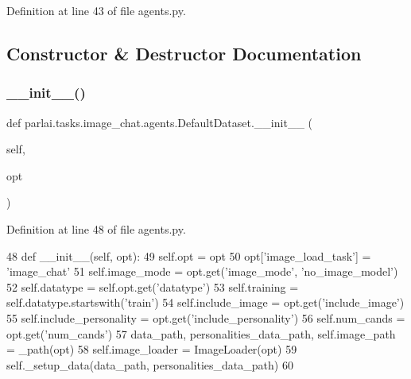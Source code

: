 Definition at line 43 of file agents.\+py.



\subsection{Constructor \& Destructor Documentation}
\mbox{\label{classparlai_1_1tasks_1_1image__chat_1_1agents_1_1DefaultDataset_a4459f064418d6dbeb9e00da5ac54c49c}} 
\subsubsection{\texorpdfstring{\+\_\+\+\_\+init\+\_\+\+\_\+()}{\_\_init\_\_()}}
{\footnotesize\ttfamily def parlai.\+tasks.\+image\+\_\+chat.\+agents.\+Default\+Dataset.\+\_\+\+\_\+init\+\_\+\+\_\+ (\begin{DoxyParamCaption}\item[{}]{self,  }\item[{}]{opt }\end{DoxyParamCaption})}



Definition at line 48 of file agents.\+py.


\begin{DoxyCode}
48     \textcolor{keyword}{def }\_\_init\_\_(self, opt):
49         self.opt = opt
50         opt[\textcolor{stringliteral}{'image\_load\_task'}] = \textcolor{stringliteral}{'image\_chat'}
51         self.image\_mode = opt.get(\textcolor{stringliteral}{'image\_mode'}, \textcolor{stringliteral}{'no\_image\_model'})
52         self.datatype = self.opt.get(\textcolor{stringliteral}{'datatype'})
53         self.training = self.datatype.startswith(\textcolor{stringliteral}{'train'})
54         self.include\_image = opt.get(\textcolor{stringliteral}{'include\_image'})
55         self.include\_personality = opt.get(\textcolor{stringliteral}{'include\_personality'})
56         self.num\_cands = opt.get(\textcolor{stringliteral}{'num\_cands'})
57         data\_path, personalities\_data\_path, self.image\_path = \_path(opt)
58         self.image\_loader = ImageLoader(opt)
59         self.\_setup\_data(data\_path, personalities\_data\_path)
60 
\end{DoxyCode}


